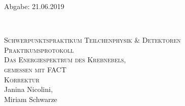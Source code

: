 



\begin{titlepage}
  \begin{flushleft}
 Abgabe: 21.06.2019
  \end{flushleft}


\HRule\\[1,0cm]

 \begin{center}


  \textsc{\Large Schwerpunktspraktikum Teilchenphysik \& Detektoren}\\[1.5cm]
  \textsc{\LARGE Praktikumsprotokoll}\\[1.5cm]
\textsc{\huge Das Energiespektrum des Krebnebels,\\ gemessen mit FACT} \\[1cm]
\textsc{Korrektur} \\[5,5cm]

Janina Nicolini\footnotemark[1], \\
Miriam Schwarze\footnotemark[2] \\[1,0cm]



 \end{center}
\HRule

 \vfill

\end{titlepage}



\newpage



\printbibliography


